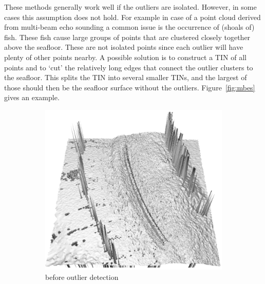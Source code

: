 These methods generally work well if the outliers are isolated.
However, in some cases this assumption does not hold.
For example in case of a point cloud derived from multi-beam echo sounding a common issue is the occurrence of (shoals of) fish. 
These fish cause large groups of points that are clustered closely together above the seafloor.
These are not isolated points since each outlier will have plenty of other points nearby.
A possible solution is to construct a TIN of all points and to `cut' the relatively long edges that connect the outlier clusters to the seafloor.
This splits the TIN into several smaller TINs, and the largest of those should then be the seafloor surface without the outliers. 
Figure~\ref{fig:mbes} gives an example.
\begin{figure}
  \centering
  \begin{subfigure}[b]{0.4\linewidth}
    \centering
    \includegraphics[width=\textwidth]{figs/mbes_cleaning_before.png}
    \caption{before outlier detection}
  \end{subfigure}
  \qquad%
  \begin{subfigure}[b]{0.4\linewidth}
    \centering

\end{subfigure}
\end{figure}
